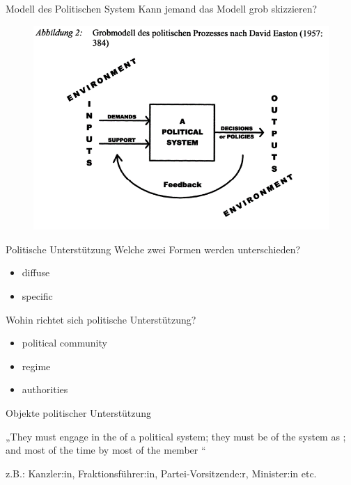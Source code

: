 \documentclass[11pt]{beamer}
\begin{document}
\begin{frame}[t]{Modell des Politischen System}
Kann jemand das Modell grob skizzieren? \\

	\begin{figure}[ht]
		\includegraphics[width=\textwidth]{pics/s2-7.png}
	\end{figure}
\end{frame}

\begin{frame}[t]{Politische Unterstützung}
Welche zwei Formen werden unterschieden? \\ \pause

\begin{itemize}
	\item diffuse
	\item specific \pause
\end{itemize}

Wohin richtet sich politische Unterstützung? \pause
\begin{itemize}
	\item political community
	\item regime
	\item authorities
\end{itemize}
\end{frame}

\begin{frame}[t]{Objekte politischer Unterstützung}
 \\ \pause

„They must engage in the  of a political system; they must be  of the system as ; and  most of the time by most of the member “ \parencite[212]{Easton1965} \\ \pause

z.B.: Kanzler:in, Fraktionsführer:in, Partei-Vorsitzende:r, Minister:in etc. 
\end{frame}
\end{document}

